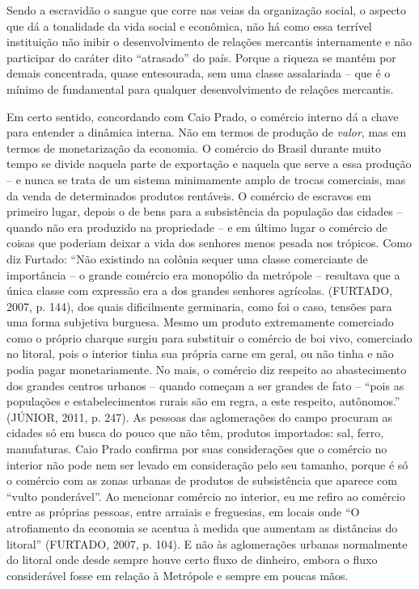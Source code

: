 Sendo a escravidão o sangue que corre nas veias da organização social, o
aspecto que dá a tonalidade da vida social e econômica, não há como essa
terrível instituição não inibir o desenvolvimento de relações mercantis
internamente e não participar do caráter dito ``atrasado'' do país.
Porque a riqueza se mantém por demais concentrada, quase entesourada,
sem uma classe assalariada -- que é o mínimo de fundamental para
qualquer desenvolvimento de relações mercantis.

Em certo sentido, concordando com Caio Prado, o comércio interno dá a
chave para entender a dinâmica interna. Não em termos de produção de
\emph{valor}, mas em termos de monetarização da economia. O comércio do
Brasil durante muito tempo se divide naquela parte de exportação e
naquela que serve a essa produção -- e nunca se trata de um sistema
minimamente amplo de trocas comerciais, mas da venda de determinados
produtos rentáveis. O comércio de escravos em primeiro lugar, depois o
de bens para a subsistência da população das cidades -- quando não era
produzido na propriedade -- e em último lugar o comércio de coisas que
poderiam deixar a vida dos senhores menos pesada nos trópicos. Como diz
Furtado: ``Não existindo na colônia sequer uma classe comerciante de
importância -- o grande comércio era monopólio da metrópole -- resultava
que a única classe com expressão era a dos grandes senhores agrícolas.
(FURTADO, 2007, p. 144), dos quais dificilmente germinaria, como foi o
caso, tensões para uma forma subjetiva burguesa. Mesmo um produto
extremamente comerciado como o próprio charque surgiu para substituir o
comércio de boi vivo, comerciado no litoral, pois o interior tinha sua
própria carne em geral, ou não tinha e não podia pagar monetariamente.
No mais, o comércio diz respeito ao abastecimento dos grandes centros
urbanos -- quando começam a ser grandes de fato -- ``pois as populações
e estabelecimentos rurais são em regra, a este respeito, autônomos.''
(JÚNIOR, 2011, p. 247). As pessoas das aglomerações do campo procuram as
cidades só em busca do pouco que não têm, produtos importados: sal,
ferro, manufaturas. Caio Prado confirma por suas considerações que o
comércio no interior não pode nem ser levado em consideração pelo seu
tamanho, porque é só o comércio com as zonas urbanas de produtos de
subsistência que aparece com ``vulto ponderável''. Ao mencionar comércio
no interior, eu me refiro ao comércio entre as próprias pessoas, entre
arraiais e freguesias, em locais onde ``O atrofiamento da economia se
acentua à medida que aumentam as distâncias do litoral'' (FURTADO, 2007,
p. 104). E não às aglomerações urbanas normalmente do litoral onde desde
sempre houve certo fluxo de dinheiro, embora o fluxo considerável fosse
em relação à Metrópole e sempre em poucas mãos.

